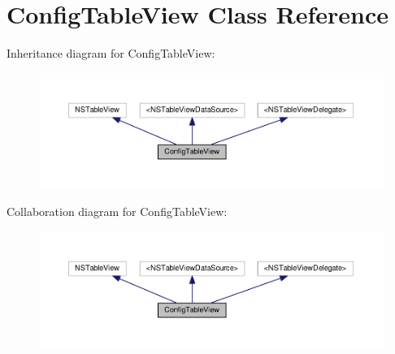 \hypertarget{interfaceConfigTableView}{}\section{Config\+Table\+View Class Reference}
\label{interfaceConfigTableView}


Inheritance diagram for Config\+Table\+View\+:
\nopagebreak
\begin{figure}[H]
\begin{center}
\leavevmode
\includegraphics[width=350pt]{interfaceConfigTableView__inherit__graph}
\end{center}
\end{figure}


Collaboration diagram for Config\+Table\+View\+:
\nopagebreak
\begin{figure}[H]
\begin{center}
\leavevmode
\includegraphics[width=350pt]{interfaceConfigTableView__coll__graph}
\end{center}
\end{figure}

